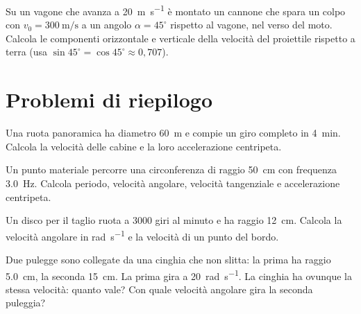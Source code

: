 \begin{esercizio}
Su un vagone che avanza a \SI{20}{\metre\per\second} è montato un cannone che spara un colpo con $v_0 = \SI{300}{\metre\per\second}$ a un angolo $\alpha = 45^\circ $ rispetto al vagone, nel verso del moto. Calcola le componenti orizzontale e verticale della velocità del proiettile rispetto a terra (usa $\sin 45^\circ  = \cos 45^\circ  \approx 0,707$).\\
\end{esercizio}

\section{Problemi di riepilogo}

\begin{esercizio}
Una ruota panoramica ha diametro \SI{60}{\metre} e compie un giro completo in \SI{4}{\minute}. Calcola la velocità delle cabine e la loro accelerazione centripeta.\\
\end{esercizio}

\begin{esercizio}
Un punto materiale percorre una circonferenza di raggio \SI{50}{\centi\metre} con frequenza \SI{3,0}{\hertz}. Calcola periodo, velocità angolare, velocità tangenziale e accelerazione centripeta.\\
\end{esercizio}

\begin{esercizio}
Un disco per il taglio ruota a \SI{3000}{} giri al minuto e ha raggio \SI{12}{\centi\metre}. Calcola la velocità angolare in \si{\radian\per\second} e la velocità di un punto del bordo.\\
\end{esercizio}

\begin{esercizio}
Due pulegge sono collegate da una cinghia che non slitta: la prima ha raggio \SI{5,0}{\centi\metre}, la seconda \SI{15}{\centi\metre}. La prima gira a \SI{20}{\radian\per\second}. La cinghia ha ovunque la stessa velocità: quanto vale? Con quale velocità angolare gira la seconda puleggia?\\
\end{esercizio}

